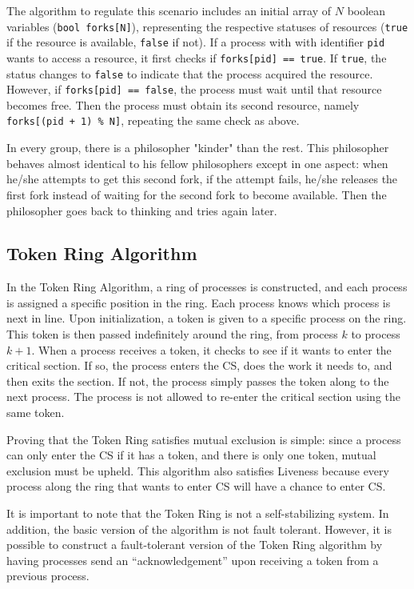 \documentclass[12pt]{article}
\begin{document}
\begin{flushleft}
The algorithm to regulate this scenario includes an initial array of $N$ boolean variables (\texttt{bool forks[N]}), representing the respective statuses of resources (\texttt{true} if the resource is available, \texttt{false} if not). If a process with with identifier \texttt{pid} wants to access a resource, it first checks if \texttt{forks[pid] == true}. If \texttt{true}, the status changes to \texttt{false} to indicate that the process acquired the resource. However, if \texttt{forks[pid] ==  false}, the process must wait until that resource becomes free. Then the process must obtain its second resource, namely \texttt{forks[(pid + 1) \% N]}, repeating the same check as above.

In every group, there is a philosopher "kinder" than the rest. This philosopher behaves almost identical to his fellow philosophers except in one aspect: when he/she attempts to get this second fork, if the attempt fails, he/she releases the first fork instead of waiting for the second fork to become available. Then the philosopher goes back to thinking and tries again later.

\subsection{Token Ring Algorithm}
In the Token Ring Algorithm, a ring of processes is constructed, and each process is assigned a specific position in the ring. Each process knows which process is next in line. Upon initialization, a token is given to a specific process on the ring. This token is then passed indefinitely around the ring, from process $k$ to process $k+1$. When a process receives a token, it checks to see if it wants to enter the critical section. If so, the process enters the CS, does the work it needs to, and then exits the section. If not, the process simply passes the token along to the next process. The process is not allowed to re-enter the critical section using the same token. 

Proving that the Token Ring satisfies mutual exclusion is simple: since a process can only enter the CS if it has a token, and there is only one token, mutual exclusion must be upheld. This algorithm also satisfies Liveness because every process along the ring that wants to enter CS will have a chance to enter CS. 

It is important to note that the Token Ring is not a self-stabilizing system. In addition, the basic version of the algorithm is not fault tolerant. However, it is possible to construct a fault-tolerant version of the Token Ring algorithm by having processes send an “acknowledgement” upon receiving a token from a previous process.


\end{flushleft}
\end{document}
